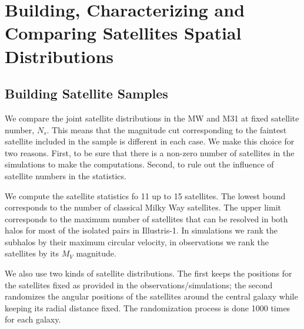 \documentclass[a4paper,fleqn,usenatbib]{mnras}
\begin{document}
\section{Building, Characterizing and Comparing Satellites Spatial Distributions}
\label{sec:SpatialMeasurements}


\subsection{Building Satellite Samples}

We compare the joint satellite distributions in the MW and M31 at fixed
satellite number, $N_s$.
This means that the magnitude cut corresponding to the faintest
satellite included in the sample is different in each case.
We make this choice for two reasons. 
First, to be sure that there is a non-zero number of satellites in the
simulations to make the computations.  
Second, to rule out the influence of satellite numbers in the
statistics. 

We compute the satellite statistics fo 11 up to 15 satellites.
The lowest bound corresponds to the number of classical Milky Way
satellites.
The upper limit corresponds to the maximum number of satellites that
can be resolved in both halos for most of the isolated pairs in Illustris-1.
In simulations we rank the subhalos by their maximum
circular velocity, in observations we rank the satellites by its $M_V$
magnitude. 

We also use two kinds of satellite distributions. 
The first keeps the positions for the satellites fixed as provided in
the observations/simulations; the second randomizes the angular positions of
the satellites around the central galaxy while keeping its radial
distance fixed. The randomization process is done 1000 times for each
galaxy. 
\end{document}
